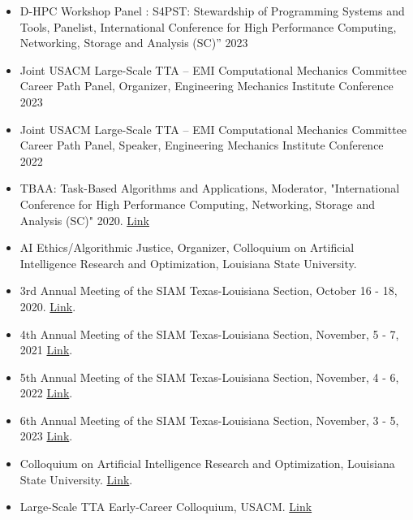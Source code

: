 \documentclass[11pt,a4paper,sans]{moderncv}
\begin{document}
\begin{itemize}[leftmargin=4cm]
\item D-HPC Workshop Panel : S4PST: Stewardship of Programming Systems and Tools, Panelist, International Conference for High Performance Computing, Networking, Storage and Analysis (SC)” 2023
\item Joint USACM Large-Scale TTA – EMI Computational Mechanics Committee Career Path Panel, Organizer, Engineering Mechanics Institute Conference 2023
\item Joint USACM Large-Scale TTA – EMI Computational Mechanics Committee Career Path Panel, Speaker, Engineering Mechanics Institute Conference 2022
\item TBAA: Task-Based Algorithms and Applications, Moderator, "International Conference for High Performance Computing, Networking, Storage and Analysis (SC)" 2020. \href{https://stellar-group.org/research/tbaa2020-scpanel/}{Link}
\item AI Ethics/Algorithmic Justice, Organizer, Colloquium on Artificial Intelligence Research and Optimization,  Louisiana State University. 
\end{itemize}


\begin{itemize}[leftmargin=4cm]
\item 3rd Annual Meeting of the SIAM Texas-Louisiana Section, October 16 - 18,  2020. \href{https://www.math.tamu.edu/conferences/SIAMTXLA/}{Link}.
\item 4th Annual Meeting of the SIAM Texas-Louisiana Section,  November,  5 - 7,  2021 \href{https://faculty.utrgv.edu/eleftherios.gkioulekas/2021-siam-txla-meeting-spi/index.html}{Link}.
\item 5th Annual Meeting of the SIAM Texas-Louisiana Section,  November,  4 - 6,  2022 \href{https://www.math.uh.edu/siamtxla22/index.shtml}{Link}.
\item 6th Annual Meeting of the SIAM Texas-Louisiana Section,  November,  3 - 5,  2023 \href{https://userweb.ucs.louisiana.edu/~C00424602/SIAMTXLA2023/}{Link}.
\end{itemize}

\begin{itemize}[leftmargin=4cm]
\item Colloquium on Artificial Intelligence Research and Optimization, Louisiana State University. \href{https://stellar-group.org/research/distributed-machine-learning/}{Link}.
\item Large-Scale TTA Early-Career Colloquium, USACM. \href{https://unsacm.memberclicks.net/tta--large-scale-structural-systems }{Link}
\end{itemize}
\end{document}
